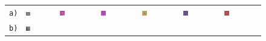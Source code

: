 \begin{figure}[h!]
	\setlength\tabcolsep{1pt}
	\def\arraystretch{0.5}
	\begin{tabular}{m{15pt}m{}m{}m{}m{}m{}m{}}
		\texttt{a)} &
		\includegraphics[width=0.15\textwidth]{images/p03/p03_01.png} &
		\includegraphics[width=0.15\textwidth]{images/gen/convolution_number/p03_01.png_2.png} &
		\includegraphics[width=0.15\textwidth]{images/gen/convolution_number/p03_01.png_3.png} &
		\includegraphics[width=0.15\textwidth]{images/gen/convolution_number/p03_01.png_4.png} &
		\includegraphics[width=0.15\textwidth]{images/gen/convolution_number/p03_01.png_5.png} &
		\includegraphics[width=0.15\textwidth]{images/gen/convolution_number/p03_01.png_6.png} \\
		\texttt{b)} &
		\includegraphics[width=0.15\textwidth]{images/p03/p03_02.png} &

\end{tabular}
\end{figure}
